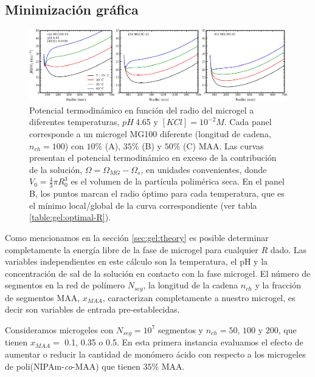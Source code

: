 \subsection{Minimizaci\'on gr\'afica}\label{sec:gel:minimi}

\begin{figure}[!htb]
\centering
\includegraphics[width=0.99\linewidth]{Figures/graph-gel/graph-min.pdf}
\caption{Potencial termodin\'amico en funci\'on del radio del microgel a diferentes temperaturas, $pH~$4.65 y $[KCl]=10^{-2}M$.
	Cada panel corresponde a un microgel MG100 diferente (longitud de cadena, $n_{ch}=100$) con $10\%$ (A), $35\%$ (B) y $50\%$ (C) MAA.
	Las curvas presentan el potencial termodin\'amico en exceso de la contribuci\'on de la soluci\'on, $\Omega=\Omega_{MG}-\Omega_s$, en unidades convenientes, donde $V_0=\frac{4}{3}\pi R_0^3$ es el volumen de la part\'icula polim\'erica seca.
	En el panel B, los puntos  marcan el radio \'optimo para cada temperatura, que es el m\'inimo local/global de la curva correspondiente (ver tabla \ref{table:gel:optimal-R}).}
\label{fig:gel:graph-min}
\end{figure}

Como mencionamos en la secci\'on \ref{sec:gel:theory} es posible determinar completamente la energ\'ia libre de la fase de microgel para cualquier $R$ dado.
Las variables independientes en este c\'alculo son la temperatura, el pH y la concentraci\'on de sal de la soluci\'on en contacto con la fase microgel.
El n\'umero de segmentos en la red de pol\'imero $N_{seg}$, la longitud de la cadena $n_{ch}$ y la fracci\'on de segmentos MAA, $x_{MAA}$, caracterizan completamente a nuestro microgel, es decir son variables de entrada pre-establecidas.


Consideramos microgeles con $N_{seg}=10^7$ segmentos y $n_{ch}=50$, $100$ y $200$, que tienen $x_{MAA}=$ 0.1, 0.35 o 0.5.
En esta primera instancia evaluamos el efecto de aumentar o reducir la cantidad de mon\'omero \'acido con respecto a los microgeles de poli(NIPAm-\emph{co}-MAA) que tienen $35\%$ MAA.

